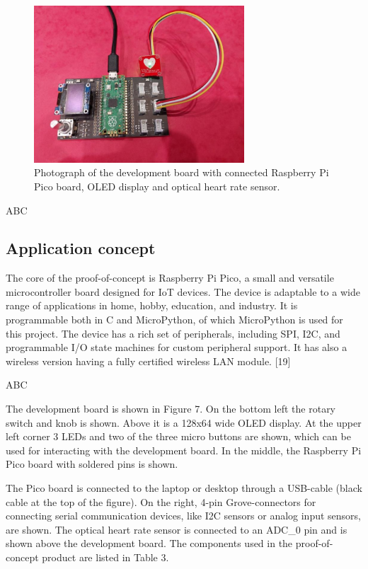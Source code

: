 \documentclass{article}
\begin{document}
\begin{figure}[h]
  \centering
  \includegraphics[width=0.7\textwidth]{raspi_heart.png}
  \caption{Photograph of the development board with connected Raspberry Pi Pico board, OLED display and
optical heart rate sensor.}
  \label{harrin}
\end{figure}

ABC

\subsection{Application concept}
The core of the proof-of-concept is Raspberry Pi Pico, a small and versatile microcontroller
board designed for IoT devices. The device is adaptable to a wide range of applications in
home, hobby, education, and industry. It is programmable both in C and MicroPython, of
which MicroPython is used for this project. The device has a rich set of peripherals, including
SPI, I2C, and programmable I/O state machines for custom peripheral support. It has also a
wireless version having a fully certified wireless LAN module. [19]

ABC

The development board is shown in Figure 7. On the bottom left the rotary switch
and knob is shown. Above it is a 128x64 wide OLED display. At the upper left corner 3 LEDs
and two of the three micro buttons are shown, which can be used for interacting with the
development board. In the middle, the Raspberry Pi Pico board with soldered pins is shown.


The Pico board is connected to the laptop or desktop through a USB-cable (black cable at
the top of the figure). On the right, 4-pin Grove-connectors for connecting serial
communication devices, like I2C sensors or analog input sensors, are shown. The optical
heart rate sensor is connected to an ADC\_0 pin and is shown above the development board.
The components used in the proof-of-concept product are listed in Table 3.
\end{document}
